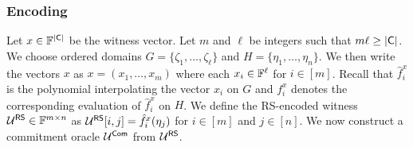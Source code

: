 \subsubsection{Encoding}\label{subsec: encode} 
Let $x \in \mathbb{F}^{|\mathsf{C}|}$ be the witness vector. Let $m$ and $\ell$ be integers such that $m\ell\geq \mathsf{|C|}$. We choose ordered domains $G=\{\zeta_1,\ldots,\zeta_\ell\}$ and $H=\{\eta_1,\ldots,\eta_n\}$. We then write the vectors $x$ as $x = (x_{1},\ldots,x_{m})$ where each $x_{i}\in \mathbb{F}^\ell$ for $i \in [m]$. Recall that $\hat{f}^x_{i}$ is the polynomial interpolating the vector $x_{i}$ on $G$ and $f^x_{i}$ denotes the corresponding evaluation of $\hat{f}^x_{i}$ on $H$. We define the RS-encoded witness $\mathcal{U}^{\mathsf{RS}}\in \mathbb{F}^{m\times n}$ as $\mathcal{U}^{\mathsf{RS}}[i,j]=\hat{f}^x_{i}(\eta_j)$ for $ i\in [m]$ and $j\in [n]$. We now construct a commitment oracle $\mathcal{U}^{\mathsf{Com}}$ from $\mathcal{U}^{\mathsf{RS}}$.
%
%
 
